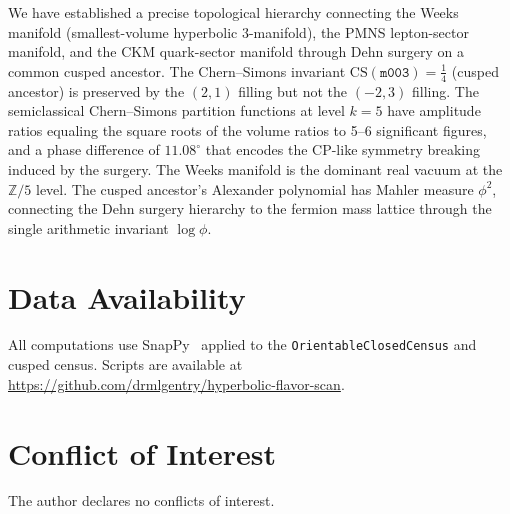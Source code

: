 \documentclass[12pt]{article}
\theoremstyle{definition}
\begin{document}
We have established a precise topological hierarchy connecting the
Weeks manifold (smallest-volume hyperbolic 3-manifold), the PMNS
lepton-sector manifold, and the CKM quark-sector manifold through
Dehn surgery on a common cusped ancestor. The Chern--Simons invariant
$\mathrm{CS}(\texttt{m003}) = \tfrac{1}{4}$ (cusped ancestor) is preserved by the $(2,1)$ filling but not the $(-2,3)$ filling.
The semiclassical Chern--Simons partition functions at level $k=5$
have amplitude ratios equaling the square roots of the volume ratios
to 5--6 significant figures, and a phase difference of $11.08^\circ$
that encodes the CP-like symmetry breaking induced by the surgery.
The Weeks manifold is the dominant real vacuum at the $\mathbb{Z}/5$
level. The cusped ancestor's Alexander polynomial has Mahler measure
$\phi^2$, connecting the Dehn surgery hierarchy to the fermion mass
lattice through the single arithmetic invariant $\log\phi$.

\section*{Data Availability}
All computations use SnapPy~\cite{SnapPy} applied to the
\texttt{OrientableClosedCensus} and cusped census. Scripts are
available at \url{https://github.com/drmlgentry/hyperbolic-flavor-scan}.

\section*{Conflict of Interest}
The author declares no conflicts of interest.
\end{document}

